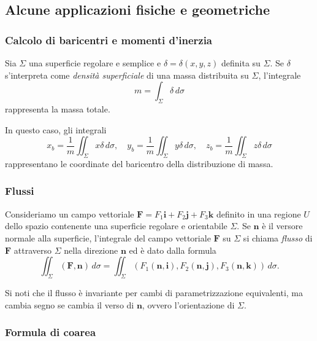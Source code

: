 \documentclass[a4paper]{book}
\numberwithin{equation}{section}
\theoremstyle{plain}
\theoremstyle{definition}
\theoremstyle{remark}
\renewcommand{\vec}{\boldsymbol}
\theoremstyle{example}
\begin{document}
\subsection{Alcune applicazioni fisiche e geometriche}

\subsubsection*{Calcolo di baricentri e momenti d'inerzia}

Sia $\Sigma$ una superficie regolare e semplice e $\delta = \delta(x, y, z)$ definita su $\Sigma$. Se $\delta$ s'interpreta come \emph{densità superficiale} di una massa distribuita su $\Sigma$, l'integrale
	\begin{equation*}
		m = \int_{\Sigma} \delta \, d\sigma
	\end{equation*}
rappresenta la massa totale.

In questo caso, gli integrali
	\begin{equation*}
		x_b = \frac{1}{m}\iint_{\Sigma}x\delta \,d\sigma, \quad y_b = \frac{1}{m}\iint_{\Sigma}y\delta\, d\sigma, \quad z_b = \frac{1}{m}\iint_{\Sigma}z\delta\, d\sigma
	\end{equation*}
rappresentano le coordinate del baricentro della distribuzione di massa.

\subsubsection*{Flussi}

Consideriamo un campo vettoriale $\vec{F} = F_1\vec{i} + F_2\vec{j}+F_3\vec{k}$ definito in una regione $U$ dello spazio contenente una superficie regolare e orientabile $\Sigma$. Se $\vec{n}$ è il versore normale alla superficie, l'integrale del campo vettoriale $\vec{F}$ su $\Sigma$ si chiama \emph{flusso} di $\vec{F}$ attraverso $\Sigma$ nella direzione $\vec{n}$ ed è dato dalla formula
	\begin{equation}
		\iint_{\Sigma}(\vec{F}, \vec{n}) \, d\sigma = \iint_{\Sigma} (F_1(\vec{n}, \vec{i}), F_2(\vec{n}, \vec{j}), F_3(\vec{n},\vec{k}))\,d\sigma.
	\end{equation}

Si noti che il flusso è invariante per cambi di parametrizzazione equivalenti, ma cambia segno se cambia il verso di $\vec{n}$, ovvero l'orientazione di $\Sigma$.

\subsubsection{Formula di coarea}
\end{document}
